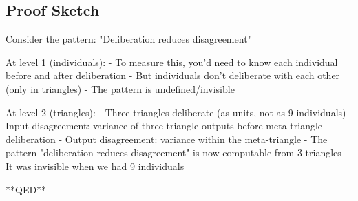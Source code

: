 \documentclass[12pt,a4paper]{article}
\theoremstyle{definition}
\begin{document}
\subsection{Proof Sketch}

Consider the pattern: "Deliberation reduces disagreement"

At level 1 (individuals):
- To measure this, you'd need to know each individual before and after deliberation
- But individuals don't deliberate with each other (only in triangles)
- The pattern is undefined/invisible

At level 2 (triangles):
- Three triangles deliberate (as units, not as 9 individuals)
- Input disagreement: variance of three triangle outputs before meta-triangle deliberation
- Output disagreement: variance within the meta-triangle
- The pattern "deliberation reduces disagreement" is now computable from 3 triangles
- It was invisible when we had 9 individuals

**QED**
\end{document}

